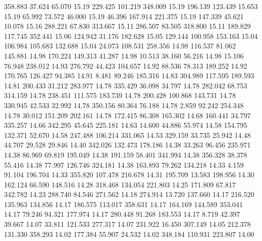  358.883   37.624   65.070        15.19
 229.425  101.219  348.009        15.19
 196.139  123.439   15.653        15.19
  65.992   73.572   46.000        15.19
  46.396  167.914  221.375        15.19
 147.339   45.621   10.078        15.16
 288.221   67.830  313.667        15.11
 286.507   83.505  318.800        15.11
 189.829  117.745  352.441        15.06
 124.942   31.176  182.628        15.05
 129.144  100.958  153.163        15.04
 106.984  105.683  132.688        15.04
  24.073  108.531  258.356        14.98
 116.537   81.062  145.881        14.98
 170.224  149.313   41.287        14.98
  10.513   38.160   56.216        14.98
  15.106   76.948  238.012        14.93
 276.792   44.423  104.657        14.92
  88.536   78.313  189.252        14.92
 170.765  126.427   94.385        14.91
   8.481   89.246  185.316        14.83
 304.989  117.595  189.593        14.81
 200.433   31.212  283.977        14.78
 335.429   36.098   34.797        14.78
 282.042   68.753  314.159        14.78
 238.451  111.575  183.739        14.78
 200.428  100.868  143.731        14.78
 330.945   42.533   32.992        14.78
 350.156   80.364   76.188        14.78
   2.859   92.242  254.348        14.78
  30.012  151.209  202.161        14.78
 172.415   86.308  165.302        14.68
 160.441   34.797  335.257        14.66
 342.295   45.645  225.181        14.63
  14.600   44.886   55.974        14.58
 154.795  132.371   52.670        14.58
 247.488  106.214  331.065        14.53
 329.159   33.735   25.942        14.48
  44.707   29.528   29.846        14.40
 342.026  132.473  178.186        14.38
  33.263   96.456  235.971        14.38
  86.969   69.819  195.049        14.38
 191.159   58.401  341.994        14.38
 356.328   38.378   55.416        14.38
  77.997  126.746  324.181        14.38
 163.893   79.262  134.218        14.33
   4.159   91.104  196.704        14.33
 355.820  107.478  216.678        14.31
 195.709   13.583  198.956        14.30
 162.124   66.590  148.516        14.28
 318.468  134.054  221.803        14.25
 171.809   67.817  342.782        14.23
 288.740   84.546  271.562        14.18
 274.914   13.720  137.660        14.17
 216.520  135.963  134.856        14.17
 186.575  113.017  358.631        14.17
 164.169  144.589  353.041        14.17
  79.246   94.321  177.974        14.17
 280.448   91.268  183.553        14.17
   8.719   42.397   39.667        14.07
  33.811  121.533  277.317        14.07
 231.922   16.450  307.149        14.05
 212.378  131.330  358.293        14.02
 177.384   55.907   24.532        14.02
 348.184  110.931  223.807        14.00
